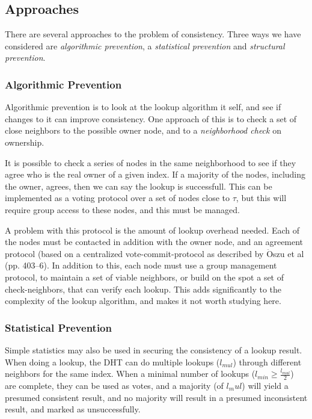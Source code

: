 \subsection{Approaches}

There are several approaches to the problem of consistency. Three ways we have considered
 are \emph{algorithmic prevention}, a \emph{statistical prevention}
 and \emph{structural prevention}.

\subsubsection{Algorithmic Prevention}

Algorithmic prevention is to look at the lookup algorithm it self, and see if
 changes to it can improve consistency. One approach of this is to check a set of
 close neighbors to the possible owner node, and to a \emph{neighborhood check} on
 ownership.

It is possible to check a series of nodes in the same neighborhood to see if they
 agree who is the real owner of a given index. If a majority of the nodes, including
 the owner, agrees, then we can say the lookup is successfull. This can be implemented
 as a voting protocol over a set of nodes close to $\tau$, but this will require group
 access to these nodes, and this must be managed.

A problem with this protocol is the amount of lookup overhead needed. Each of the
  nodes must be contacted in addition with the owner node, and an agreement
 protocol (based on a centralized vote-commit-protocol as described by
 $\mathrm{\ddot{O}}$szu et al\cite{oszu-99-podds} (pp. 403--6).
 In addition to this, each node must use a group
 management protocol, to maintain a set of viable neighbors, or build on the spot a set
 of check-neighbors, that can verify each lookup. This adds significantly to the
 complexity of the lookup algorithm, and makes it not worth studying here.

\subsubsection{Statistical Prevention}

Simple statistics may also be used in securing the consistency of a lookup result.
 When doing a lookup, the DHT can do multiple lookups ($l_{mul}$) through different
 neighbors for the same index. When a minimal number of lookups
 ($l_{min}\geq\frac{l_{mul}}{2}$) are complete, they can be used as votes, and a
 majority (of $l_mul$) will yield a presumed consistent result, and no majority will result in
 a presumed inconsistent result, and marked as unsuccessfully.

